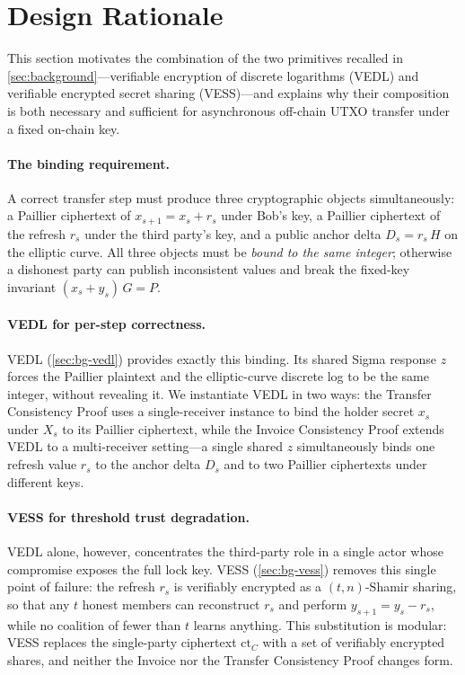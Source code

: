 \section{Design Rationale}\label{sec:motivation}

This section motivates the combination of the two primitives recalled in \autoref{sec:background}---verifiable encryption of discrete logarithms (VEDL) and verifiable encrypted secret sharing (VESS)---and explains why their composition is both necessary and sufficient for asynchronous off-chain UTXO transfer under a fixed on-chain key.

\paragraph{The binding requirement.}
A correct transfer step must produce three cryptographic objects simultaneously: a Paillier ciphertext of $x_{s+1} = x_s + r_s$ under Bob's key, a Paillier ciphertext of the refresh $r_s$ under the third party's key, and a public anchor delta $D_s = r_s\,H$ on the elliptic curve. All three objects must be \emph{bound to the same integer}; otherwise a dishonest party can publish inconsistent values and break the fixed-key invariant $(x_s + y_s)\,G = P$.

\paragraph{VEDL for per-step correctness.}
VEDL (\autoref{sec:bg-vedl}) provides exactly this binding. Its shared Sigma response $z$ forces the Paillier plaintext and the elliptic-curve discrete log to be the same integer, without revealing it. We instantiate VEDL in two ways: the Transfer Consistency Proof uses a single-receiver instance to bind the holder secret $x_s$ under $X_s$ to its Paillier ciphertext, while the Invoice Consistency Proof extends VEDL to a multi-receiver setting---a single shared $z$ simultaneously binds one refresh value $r_s$ to the anchor delta $D_s$ and to two Paillier ciphertexts under different keys.

\paragraph{VESS for threshold trust degradation.}
VEDL alone, however, concentrates the third-party role in a single actor whose compromise exposes the full lock key. VESS (\autoref{sec:bg-vess}) removes this single point of failure: the refresh $r_s$ is verifiably encrypted as a $(t,n)$-Shamir sharing, so that any $t$ honest members can reconstruct $r_s$ and perform $y_{s+1} = y_s - r_s$, while no coalition of fewer than $t$ learns anything. This substitution is modular: VESS replaces the single-party ciphertext $\mathrm{ct}_C$ with a set of verifiably encrypted shares, and neither the Invoice nor the Transfer Consistency Proof changes form.


